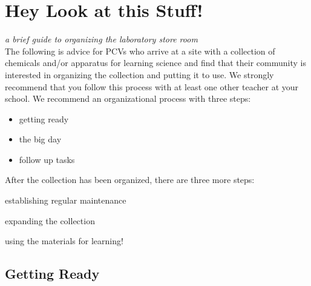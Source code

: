 \chapter{Hey Look at this Stuff!}
\textit{a brief guide to organizing the laboratory store room}\\

The following is advice for PCVs who arrive at a site with a collection of chemicals and/or apparatus for learning science and find that their community is interested in organizing the collection and putting it to use. We strongly recommend that you follow this process with at least one other teacher at your school. We recommend an organizational process with three steps:
\begin{itemize}
\item{getting ready}
\item{the big day}
\item{follow up tasks}
\end{itemize}

After the collection has been organized, there are three more steps:
\item{establishing regular maintenance}
\item{expanding the collection}
\item{using the materials for learning!}

\section{Getting Ready}

